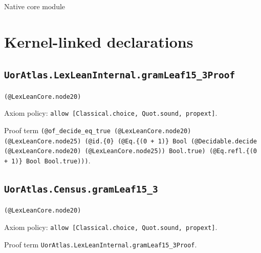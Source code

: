 \documentclass[11pt]{article}
\begin{document}
\begin{center}{\LARGE Native core module}\end{center}
\section*{Kernel-linked declarations}
\subsection*{\texttt{UorAtlas.LexLeanInternal.gramLeaf15\_3Proof}}
\noindent\texttt{(@LexLeanCore.node20)}\par
\noindent Axiom policy: \texttt{allow [Classical.choice, Quot.sound, propext]}.\par
\noindent Proof term \texttt{(@of\_decide\_eq\_true (@LexLeanCore.node20) (@LexLeanCore.node25) (@id.\{0\} (@Eq.\{(0 + 1)\} Bool (@Decidable.decide (@LexLeanCore.node20) (@LexLeanCore.node25)) Bool.true) (@Eq.refl.\{(0 + 1)\} Bool Bool.true)))}.\par
\subsection*{\texttt{UorAtlas.Census.gramLeaf15\_3}}
\noindent\texttt{(@LexLeanCore.node20)}\par
\noindent Axiom policy: \texttt{allow [Classical.choice, Quot.sound, propext]}.\par
\noindent Proof term \texttt{UorAtlas.LexLeanInternal.gramLeaf15\_3Proof}.\par
\end{document}
